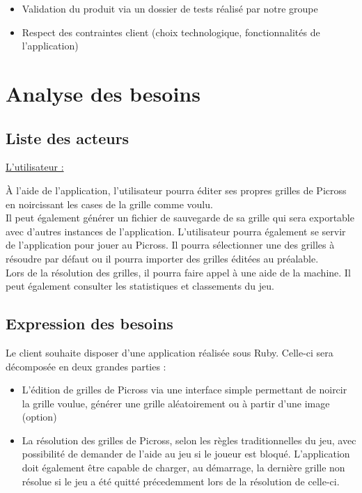 \documentclass[a4paper, 12pt, twoside]{article}
\begin{document}
\begin{itemize}

 \item Validation du produit via un dossier de tests réalisé par notre groupe
 \item Respect des contraintes client (choix technologique, fonctionnalités de l'application)
 
\end{itemize}

\section{Analyse des besoins}

\subsection{Liste des acteurs}

\ul{L'utilisateur :}\newline

À l'aide de l'application, l'utilisateur pourra éditer ses propres grilles de Picross en noircissant les cases de la grille comme voulu. \\Il peut également générer un fichier de sauvegarde de sa grille qui sera exportable avec d'autres instances de l'application.
L'utilisateur pourra également se servir de l'application pour jouer au Picross. Il pourra sélectionner une des grilles à résoudre par défaut ou il pourra importer des grilles éditées au préalable.\\ Lors de la résolution des grilles, il pourra faire appel à une aide de la machine. Il peut également consulter les statistiques et classements du jeu.

\subsection{Expression des besoins}

Le client souhaite disposer d'une application réalisée sous Ruby. Celle-ci sera décomposée en deux grandes parties :\newline

\begin{itemize}\setlength{\itemsep}{3mm}

  \item[\textbullet] L'édition de grilles de Picross via une interface simple permettant de noircir la grille voulue, générer une grille aléatoirement ou à partir d'une image (option)\newline
  \item[\textbullet] La résolution des grilles de Picross, selon les règles traditionnelles du jeu, avec possibilité de demander de l'aide au jeu si le joueur est bloqué.
 L'application doit également être capable de charger, au démarrage, la dernière grille non résolue si le jeu a été quitté précedemment lors de la résolution de celle-ci.

\end{itemize}
 
\end{document}
